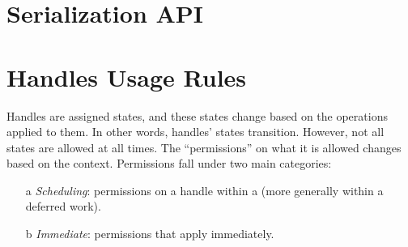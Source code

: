 

\section{Serialization API}










\newcommand{\specialcell}[2][c]{%
  \begin{tabular}[#1]{@{}c@{}}#2\end{tabular}}
\newcommand{\yes}{\text{\ding{51}}}
\newcommand{\no}{\text{\ding{55}}}


\section{Handles Usage Rules}

Handles are assigned states, and these states change 
based on the operations applied to them. In other words, 
handles' states transition. However, not all states 
are allowed at all times. The ``permissions'' on 
what it is allowed changes based on the context. 
Permissions fall under two main categories: 
\begin{itemize}
\item[a] {\it Scheduling}: permissions on a handle 
within a  (more generally within a deferred work).
\item[b] {\it Immediate}: permissions that apply immediately.
\end{itemize}

